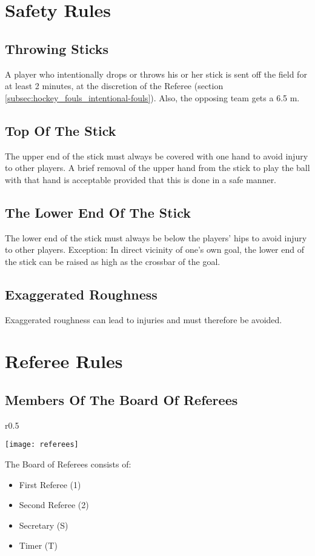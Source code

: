 \section{Safety Rules}

\subsection{Throwing Sticks}
A player who intentionally drops or throws his or her stick is sent off the field for at least 2 minutes, at the discretion of the Referee (section \ref{subsec:hockey_fouls_intentional-fouls}).
Also, the opposing team gets a 6.5 m.

\subsection{Top Of The Stick}
The upper end of the stick must always be covered with one hand to avoid injury to other players.
A brief removal of the upper hand from the stick to play the ball with that hand is acceptable provided that this is done in a safe manner.

\subsection{The Lower End Of The Stick}
The lower end of the stick must always be below the players' hips to avoid injury to other players.
Exception: In direct vicinity of one's own goal, the lower end of the stick can be raised as high as the crossbar of the goal.

\subsection{Exaggerated Roughness}
Exaggerated roughness can lead to injuries and must therefore be avoided.

\section{Referee Rules}

 \subsection{Members Of The Board Of Referees}
\begin{wrapfigure}{r}{0.5\textwidth}
\begin{center}
\texttt{[image: referees]}
\end{center}
\end{wrapfigure}
 The Board of Referees consists of:
\begin{itemize}
\item First Referee (1) 
\item Second Referee (2)
\item Secretary (S)
\item Timer (T)
\end{itemize} 

